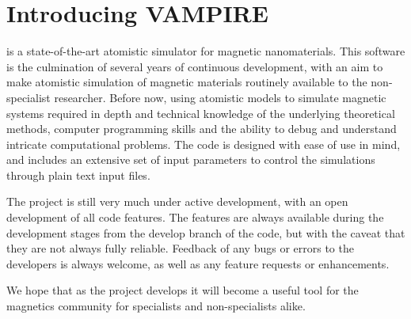 \chapter*{Introducing {\Huge VAMPIRE}}

\vampire is a state-of-the-art atomistic simulator for magnetic nanomaterials.
This software is the culmination of several years of continuous development,
with an aim to make atomistic simulation of magnetic materials routinely
available to the non-specialist researcher. Before now, using atomistic
models to simulate magnetic systems required in depth and technical knowledge
of the underlying theoretical methods, computer programming skills and the
ability to debug and understand intricate computational problems. The code is
designed with ease of use in mind, and includes an extensive set of input
parameters to control the simulations through plain text input files.

The \vampire project is still very much under active development, with an open
development of all code features. The features are always available during the
development stages from the develop branch of the code, but with the caveat that
they are not always fully reliable. Feedback of any bugs or errors to the
\vampire developers is always welcome, as well as any feature requests or
enhancements.

We hope that as the \vampire project develops it will become a useful tool for
the magnetics community for specialists and non-specialists alike.
